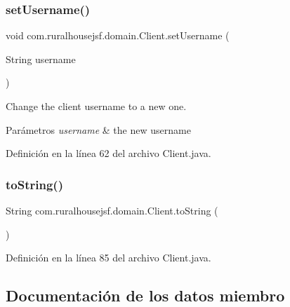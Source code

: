 \subsubsection{\texorpdfstring{setUsername()}{setUsername()}}
{\footnotesize\ttfamily void com.\+ruralhousejsf.\+domain.\+Client.\+set\+Username (\begin{DoxyParamCaption}\item[{String}]{username }\end{DoxyParamCaption})}



Change the client username to a new one. 


\begin{DoxyParams}{Parámetros}
{\em username} & the new username \\
\hline
\end{DoxyParams}


Definición en la línea 62 del archivo Client.\+java.

\mbox{\label{classcom_1_1ruralhousejsf_1_1domain_1_1_client_a9af93d16608b629f3606f859b0ec85e9}} 
\subsubsection{\texorpdfstring{toString()}{toString()}}
{\footnotesize\ttfamily String com.\+ruralhousejsf.\+domain.\+Client.\+to\+String (\begin{DoxyParamCaption}{ }\end{DoxyParamCaption})}



Definición en la línea 85 del archivo Client.\+java.



\subsection{Documentación de los datos miembro}
\mbox{\label{classcom_1_1ruralhousejsf_1_1domain_1_1_client_ab353a203ee0d84148e34fbb27ff0dbb8}} 
